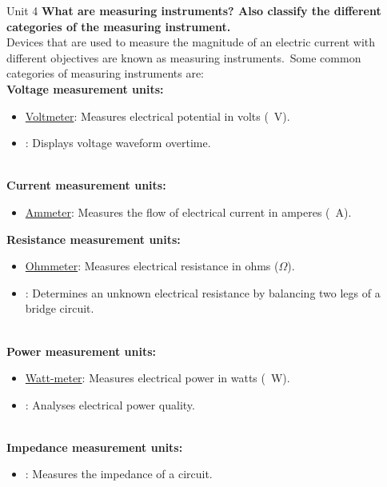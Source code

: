\documentclass[11pt]{beamer}
\begin{document}
    \begin{frame}[allowframebreaks]{Unit 4}
        \textbf{\Large What are measuring instruments? Also classify the different categories of the measuring
        instrument.}~\\[10pt]

        Devices that are used to measure the magnitude of an electric current with different objectives are known as
        measuring instruments.\ Some common categories of measuring instruments are:\\[10pt]

        \textbf{Voltage measurement units:}
        \begin{itemize}
            \item \underline{Voltmeter}: Measures electrical potential in volts (\SI{}{\volt}).
            \item \underline{}: Displays voltage waveform overtime.
        \end{itemize}

        \\[10pt]

        \textbf{Current measurement units:}
        \begin{itemize}
            \item \underline{Ammeter}: Measures the flow of electrical current in amperes (\SI{}{\ampere}).
        \end{itemize}

        \framebreak

        \textbf{Resistance measurement units:}
        \begin{itemize}
            \item \underline{Ohmmeter}: Measures electrical resistance in ohms ($\Omega$).
            \item \underline{}: Determines an unknown electrical resistance by balancing two
            legs of a bridge circuit.
        \end{itemize}

        \\[10pt]

        \textbf{Power measurement units:}
        \begin{itemize}
            \item \underline{Watt-meter}: Measures electrical power in watts (\SI{}{\watt}).
            \item \underline{}: Analyses electrical power quality.
        \end{itemize}

        \\[10pt]

        \textbf{Impedance measurement units:}
        \begin{itemize}
            \item \underline{}: Measures the impedance of a circuit.
        \end{itemize}
    \end{frame}
\end{document}

